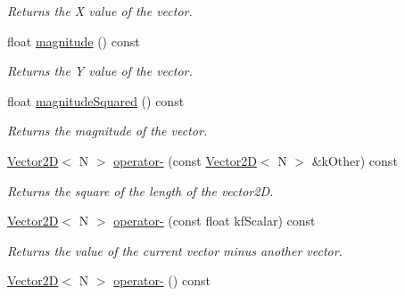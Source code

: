 \begin{DoxyCompactItemize}
\begin{DoxyCompactList}\small\item\em Returns the X value of the vector. \end{DoxyCompactList}\item 
\hypertarget{class_vector2_d_a9f7e7889fad81bd9ee74e1b13971f9c8}{float \hyperlink{class_vector2_d_a9f7e7889fad81bd9ee74e1b13971f9c8}{magnitude} () const }\label{class_vector2_d_a9f7e7889fad81bd9ee74e1b13971f9c8}

\begin{DoxyCompactList}\small\item\em Returns the Y value of the vector. \end{DoxyCompactList}\item 
\hypertarget{class_vector2_d_a8987f5af709e06776682cb76774ec54e}{float \hyperlink{class_vector2_d_a8987f5af709e06776682cb76774ec54e}{magnitude\+Squared} () const }\label{class_vector2_d_a8987f5af709e06776682cb76774ec54e}

\begin{DoxyCompactList}\small\item\em Returns the magnitude of the vector. \end{DoxyCompactList}\item 
\hyperlink{class_vector2_d}{Vector2\+D}$<$ N $>$ \hyperlink{class_vector2_d_abe4ad594ca6c0ef36514452006727a05}{operator-\/} (const \hyperlink{class_vector2_d}{Vector2\+D}$<$ N $>$ \&k\+Other) const 
\begin{DoxyCompactList}\small\item\em Returns the square of the length of the vector2\+D. \end{DoxyCompactList}\item 
\hyperlink{class_vector2_d}{Vector2\+D}$<$ N $>$ \hyperlink{class_vector2_d_ab85731551989b97ca8a3d72804a1b751}{operator-\/} (const float kf\+Scalar) const 
\begin{DoxyCompactList}\small\item\em Returns the value of the current vector minus another vector. \end{DoxyCompactList}\item 
\hypertarget{class_vector2_d_a71521323d87489bccf35d711cf1068a4}{\hyperlink{class_vector2_d}{Vector2\+D}$<$ N $>$ \hyperlink{class_vector2_d_a71521323d87489bccf35d711cf1068a4}{operator-\/} () const }\label{class_vector2_d_a71521323d87489bccf35d711cf1068a4}


\end{DoxyCompactItemize}
